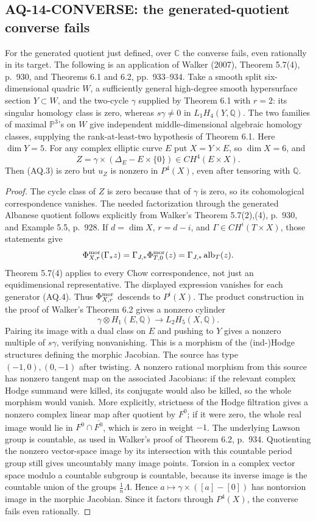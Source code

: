\documentclass[11pt,a4paper]{article}
\theoremstyle{definition}\newtheorem{definition}[theorem]{Definition}
\theoremstyle{remark}\newtheorem{remark}[theorem]{Remark}
\begin{document}
\subsection{AQ-14-CONVERSE: the generated-quotient converse fails}
For the generated quotient just defined, over $\mathbb C$
the converse fails, even rationally in its target.
The following is an application of Walker (2007), Theorem 5.7(4),
p.~930, and Theorems 6.1 and 6.2, pp.~933--934.
Take a smooth split six-dimensional quadric $W$,
a sufficiently general high-degree smooth hypersurface section
$Y\subset W$, and the two-cycle $\gamma$ supplied by Theorem 6.1
with $r=2$: its singular homology class is zero, whereas
$s\gamma\ne0$ in $L_1H_4(Y,\mathbb Q)$.
The two families of maximal $\mathbb P^3$'s on $W$
give independent middle-dimensional algebraic
homology classes, supplying the rank-at-least-two
hypothesis of Theorem 6.1.
Here $\dim Y=5$. For any complex elliptic curve $E$ put
$X=Y\times E$, so $\dim X=6$, and
\[
 Z=\gamma\times(\Delta_E-E\times\{0\})\in CH^4(E\times X).
\]
Then (AQ.3) is zero but $u_Z$ is nonzero in $P^4(X)$,
even after tensoring with $\mathbb Q$.
\begin{proof}
The cycle class of $Z$ is zero because that of $\gamma$ is zero,
so its cohomological correspondence vanishes.
The needed factorization through the generated Albanese
quotient follows explicitly from Walker's Theorem 5.7(2),(4),
p.~930, and Example 5.5, p.~928. If $d=\dim X$,
$r=d-i$, and $\Gamma\in CH^i(T\times X)$, those statements give
\[
 \Phi^{\rm mor}_{X,r}(\Gamma_*z)
    =\Gamma_{J,*}\Phi^{\rm mor}_{T,0}(z)
    =\Gamma_{J,*}\operatorname{alb}_T(z).
\]
Theorem 5.7(4) applies to every Chow correspondence, not just
an equidimensional representative. The displayed expression
vanishes for each generator (AQ.4). Thus
$\Phi^{\rm mor}_{X,r}$ descends to $P^i(X)$.
The product construction in the proof of Walker's Theorem 6.2
gives a nonzero cylinder
\[
 \gamma\otimes H_1(E,\mathbb Q)\longrightarrow L_2H_5(X,\mathbb Q).
\]
Pairing its image with a dual class on $E$ and pushing to $Y$
gives a nonzero multiple of $s\gamma$, verifying nonvanishing.
This is a morphism of the (ind-)Hodge structures defining
the morphic Jacobian. The source has type $(-1,0),(0,-1)$
after twisting. A nonzero rational morphism from this source
has nonzero tangent map on the associated Jacobians: if the
relevant complex Hodge summand were killed, its conjugate
would also be killed, so the whole morphism would vanish.
More explicitly, strictness of the Hodge filtration gives
a nonzero complex linear map after quotient by $F^0$;
if it were zero, the whole real image would lie in
$F^0\cap\overline{F^0}$, which is zero in weight $-1$.
The underlying Lawson group is countable, as used in
Walker's proof of Theorem 6.2, p.~934. Quotienting the
nonzero vector-space image by its intersection with
this countable period group still gives uncountably
many image points. Torsion in a complex vector space
modulo a countable subgroup is countable, because
its inverse image is the countable union of the
groups $\tfrac1n\Lambda$. Hence
$a\mapsto\gamma\times([a]-[0])$ has nontorsion image
in the morphic Jacobian.
Since it factors through $P^4(X)$, the converse fails
even rationally.
\end{proof}
\end{document}
